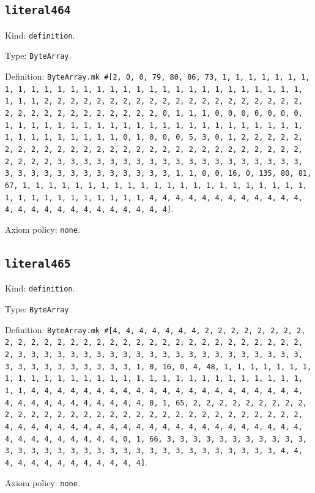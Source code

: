 \documentclass[11pt]{article}
\begin{document}
\subsection*{\texttt{literal464}}
\noindent Kind: \texttt{definition}.\par
\noindent Type: \texttt{ByteArray}.\par
\noindent Definition: \texttt{ByteArray.mk \#[2, 0, 0, 79, 80, 86, 73, 1, 1, 1, 1, 1, 1, 1, 1, 1, 1, 1, 1, 1, 1, 1, 1, 1, 1, 1, 1, 1, 1, 1, 1, 1, 1, 1, 1, 1, 1, 1, 1, 1, 2, 2, 2, 2, 2, 2, 2, 2, 2, 2, 2, 2, 2, 2, 2, 2, 2, 2, 2, 2, 2, 2, 2, 2, 2, 2, 2, 2, 2, 2, 2, 2, 0, 1, 1, 1, 0, 0, 0, 0, 0, 0, 0, 1, 1, 1, 1, 1, 1, 1, 1, 1, 1, 1, 1, 1, 1, 1, 1, 1, 1, 1, 1, 1, 1, 1, 1, 1, 1, 1, 1, 1, 1, 1, 1, 0, 1, 0, 0, 0, 5, 3, 0, 1, 2, 2, 2, 2, 2, 2, 2, 2, 2, 2, 2, 2, 2, 2, 2, 2, 2, 2, 2, 2, 2, 2, 2, 2, 2, 2, 2, 2, 2, 2, 2, 2, 3, 3, 3, 3, 3, 3, 3, 3, 3, 3, 3, 3, 3, 3, 3, 3, 3, 3, 3, 3, 3, 3, 3, 3, 3, 3, 3, 3, 3, 3, 3, 3, 1, 1, 0, 0, 16, 0, 135, 80, 81, 67, 1, 1, 1, 1, 1, 1, 1, 1, 1, 1, 1, 1, 1, 1, 1, 1, 1, 1, 1, 1, 1, 1, 1, 1, 1, 1, 1, 1, 1, 1, 1, 1, 1, 4, 4, 4, 4, 4, 4, 4, 4, 4, 4, 4, 4, 4, 4, 4, 4, 4, 4, 4, 4, 4, 4, 4, 4, 4]}.\par
\noindent Axiom policy: \texttt{none}.\par
\subsection*{\texttt{literal465}}
\noindent Kind: \texttt{definition}.\par
\noindent Type: \texttt{ByteArray}.\par
\noindent Definition: \texttt{ByteArray.mk \#[4, 4, 4, 4, 4, 4, 4, 2, 2, 2, 2, 2, 2, 2, 2, 2, 2, 2, 2, 2, 2, 2, 2, 2, 2, 2, 2, 2, 2, 2, 2, 2, 2, 2, 2, 2, 2, 2, 2, 3, 3, 3, 3, 3, 3, 3, 3, 3, 3, 3, 3, 3, 3, 3, 3, 3, 3, 3, 3, 3, 3, 3, 3, 3, 3, 3, 3, 3, 3, 3, 3, 1, 0, 16, 0, 4, 48, 1, 1, 1, 1, 1, 1, 1, 1, 1, 1, 1, 1, 1, 1, 1, 1, 1, 1, 1, 1, 1, 1, 1, 1, 1, 1, 1, 1, 1, 1, 1, 1, 4, 4, 4, 4, 4, 4, 4, 4, 4, 4, 4, 4, 4, 4, 4, 4, 4, 4, 4, 4, 4, 4, 4, 4, 4, 4, 4, 4, 4, 4, 4, 4, 0, 1, 65, 2, 2, 2, 2, 2, 2, 2, 2, 2, 2, 2, 2, 2, 2, 2, 2, 2, 2, 2, 2, 2, 2, 2, 2, 2, 2, 2, 2, 2, 2, 2, 2, 4, 4, 4, 4, 4, 4, 4, 4, 4, 4, 4, 4, 4, 4, 4, 4, 4, 4, 4, 4, 4, 4, 4, 4, 4, 4, 4, 4, 4, 4, 4, 4, 0, 1, 66, 3, 3, 3, 3, 3, 3, 3, 3, 3, 3, 3, 3, 3, 3, 3, 3, 3, 3, 3, 3, 3, 3, 3, 3, 3, 3, 3, 3, 3, 3, 3, 3, 4, 4, 4, 4, 4, 4, 4, 4, 4, 4, 4, 4, 4]}.\par
\noindent Axiom policy: \texttt{none}.\par
\end{document}
